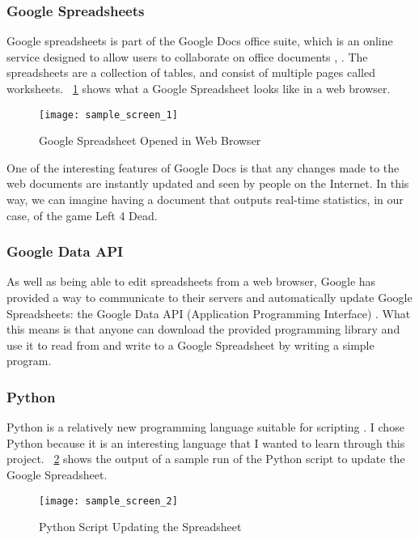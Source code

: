 \subsubsection{Google Spreadsheets}
Google spreadsheets is part of the Google Docs office suite, which is an online service designed to allow users to collaborate on office documents \cite{web:google_spreadsheets}, \cite{web:google_docs}. The spreadsheets are a collection of tables, and consist of multiple pages called worksheets. \figurename\ \ref{fig:sample1} shows what a Google Spreadsheet looks like in a web browser.
\begin{figure}[htb!]
\centering
\texttt{[image: sample\_screen\_1]}
\caption{Google Spreadsheet Opened in Web Browser}
\label{fig:sample1}
\end{figure}

One of the interesting features of Google Docs is that any changes made to the web documents are instantly updated and seen by people on the Internet. In this way, we can imagine having a document that outputs real-time statistics, in our case, of the game Left 4 Dead.

\subsubsection{Google Data API}
As well as being able to edit spreadsheets from a web browser, Google has provided a way to communicate to their servers and automatically update Google Spreadsheets: the Google Data API (Application Programming Interface) \cite{web:google_api}. What this means is that anyone can download the provided programming library and use it to read from and write to a Google Spreadsheet by writing a simple program.

\subsubsection{Python}
Python is a relatively new programming language suitable for scripting \cite{web:python}. I chose Python because it is an interesting language that I wanted to learn through this project. \figurename\ \ref{fig:sample2} shows the output of a sample run of the Python script to update the Google Spreadsheet.
\begin{figure}[htb!]
\centering
\texttt{[image: sample\_screen\_2]}
\caption{Python Script Updating the Spreadsheet}
\label{fig:sample2}
\end{figure}
